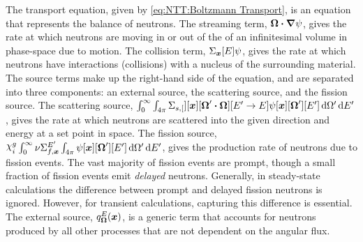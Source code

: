 {{    The transport equation, given by \cref{eq:NTT:Boltzmann Transport}, is an equation that represents the balance of neutrons.
    The streaming term, $\boldsymbol{\Omega}\boldsymbol{\cdot}\boldsymbol{\nabla}\psi$, gives the rate at which neutrons are moving in or out of the of an infinitesimal volume in phase-space due to motion.
    The collision term, $\xst[\loc][E]\aflux$, gives the rate at which neutrons have interactions (collisions) with a nucleus of the surrounding material.
    The source terms make up the right-hand side of the equation, and are separated into three components: an external source, the scattering source, and the fission source.
    The scattering source, $\intl[0][\infty]\intl[\fourpi]\xss[][\loc][\dirprime\vdot\dir][\Eprime\to E]\aflux[\loc][\dirprime][\Eprime]\ddirprime\dif{\Eprime}$, gives the rate at which neutrons are scattered into the given direction and energy at a set point in space.
    The fission source, $\spect\intl[0][\infty]\nufis[\loc][\Eprime]\intl[\fourpi]\aflux[\loc][\dirprime][\Eprime]\ddirprime\dif{\Eprime}$, gives the production rate of neutrons due to fission events.
    The vast majority of fission events are prompt, though a small fraction of fission events emit \emph{delayed} neutrons.
    Generally, in steady-state calculations the difference between prompt and delayed fission neutrons is ignored.
    However, for transient calculations, capturing this difference is essential.
    The external source, $\source[\loc][\dir][E]$, is a generic term that accounts for neutrons produced by all other processes that are not dependent on the angular flux.

}}
